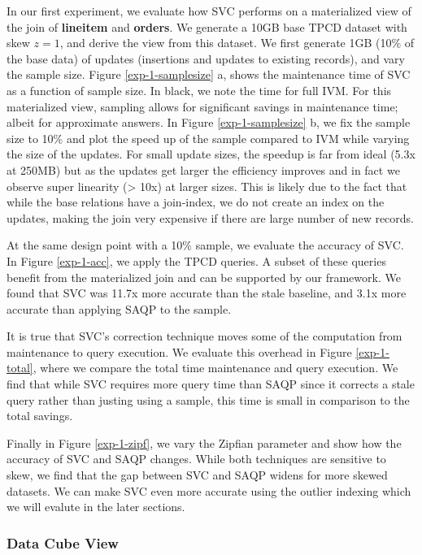 In our first experiment, we evaluate how SVC performs on a materialized view of the join of \textbf{lineitem} and \textbf{orders}.
We generate a 10GB base TPCD dataset with skew $z=1$, and derive the view from this dataset.
We first generate 1GB (10\% of the base data) of updates (insertions and updates to existing records), and vary the sample size.
Figure \ref{exp-1-samplesize} a, shows the maintenance time of SVC as a function of sample size.
In black, we note the time for full IVM.
For this materialized view, sampling allows for significant savings in maintenance time; albeit for approximate answers.
In Figure \ref{exp-1-samplesize} b, we fix the sample size to 10\% and plot the speed up of the sample compared to IVM while varying the size of the updates.
For small update sizes, the speedup is far from ideal (5.3x at 250MB) but as the updates get larger the efficiency improves and in fact we observe super linearity (> 10x) at larger sizes.
This is likely due to the fact that while the base relations have a join-index, we do not create an index on the updates, making the join very expensive if there are large number of new records.

At the same design point with a 10\% sample, we evaluate the accuracy of SVC.
In Figure \ref{exp-1-acc}, we apply the TPCD queries.
A subset of these queries benefit from the materialized join and can be supported by our framework.
We found that SVC was 11.7x more accurate than the stale baseline, and 3.1x more accurate than applying SAQP to the sample.

It is true that SVC's correction technique moves some of the computation from maintenance to query execution.
We evaluate this overhead in Figure \ref{exp-1-total}, where we compare the total time maintenance and query execution.
We find that while SVC requires more query time than SAQP since it corrects a stale query rather than justing using a sample, 
this time is small in comparison to the total savings. 

Finally in Figure \ref{exp-1-zipf}, we vary the Zipfian parameter and show how the accuracy of SVC and SAQP changes.
While both techniques are sensitive to skew, we find that the gap between SVC and SAQP widens for more skewed datasets.
We can make SVC even more accurate using the outlier indexing which we will evalute in the later sections.

\subsubsection{Data Cube View}
\label{exp-datacube}

